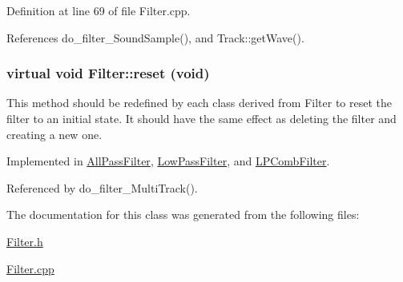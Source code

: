 Definition at line 69 of file Filter.cpp.

References do\_\-filter\_\-Sound\-Sample(), and Track::get\-Wave().\hypertarget{classFilter_a4}{
\subsubsection[reset]{\setlength{\rightskip}{0pt plus 5cm}virtual void Filter::reset (void)}}
\label{classFilter_a4}


This method should be redefined by each class derived from Filter to reset the filter to an initial state. It should have the same effect as deleting the filter and creating a new one. 

Implemented in \hyperlink{classAllPassFilter_a3}{All\-Pass\-Filter}, \hyperlink{classLowPassFilter_a3}{Low\-Pass\-Filter}, and \hyperlink{classLPCombFilter_a3}{LPComb\-Filter}.

Referenced by do\_\-filter\_\-Multi\-Track().

The documentation for this class was generated from the following files:\begin{CompactItemize}
\item 
\hyperlink{Filter_8h}{Filter.h}\item 
\hyperlink{Filter_8cpp}{Filter.cpp}\end{CompactItemize}
